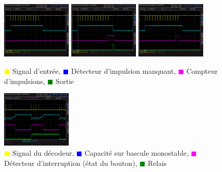 \documentclass[french]{layout/Report}
\begin{document}
\begin{figure}[H]
\centering
\includegraphics[width=0.3\textwidth]{../measurements/SCR06}
\includegraphics[width=0.3\textwidth]{../measurements/SCR07}
\includegraphics[width=0.3\textwidth]{../measurements/SCR08}
\caption{
\textcolor{yellow}{$\blacksquare$} Signal d'entrée,
\textcolor{blue}{$\blacksquare$} Détecteur d'impulsion manquant,
\textcolor{magenta}{$\blacksquare$} Compteur d'impulsions,
\textcolor{green}{$\blacksquare$} Sortie
}
\label{fig:decoder_signal}
\end{figure}

\begin{figure}[H]
\centering
\includegraphics[width=0.3\textwidth]{../measurements/SCR12}
\caption{
\textcolor{yellow}{$\blacksquare$} Signal du décodeur,
\textcolor{blue}{$\blacksquare$} Capacité sur bascule monostable,
\textcolor{magenta}{$\blacksquare$} Détecteur d'interruption (état du bouton),
\textcolor{green}{$\blacksquare$} Relais
}
\label{fig:output_signal}
\end{figure}
\end{document}
